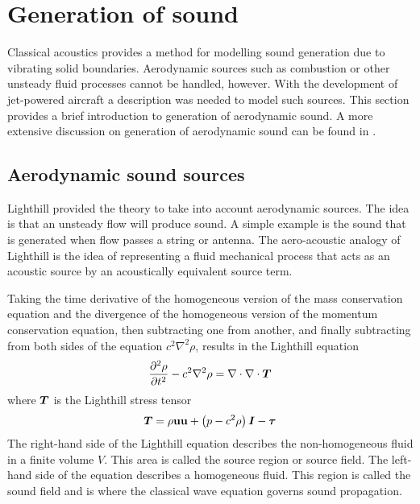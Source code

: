 \section{Generation of sound}\label{sec:theory:generation}

Classical acoustics provides a method for modelling sound generation due to
vibrating solid boundaries. Aerodynamic sources such as combustion or other
unsteady fluid processes cannot be handled, however. With the development of
jet-powered aircraft a description was needed to model such sources. This
section provides a brief introduction to generation of aerodynamic sound. A more
extensive discussion on generation of aerodynamic sound can be found in
\cite{Rienstra2017}.

\subsection{Aerodynamic sound sources}\label{sec:theory:sound:aerodynamic}
Lighthill provided the theory to take into account aerodynamic sources. The idea
is that an unsteady flow will produce sound. A simple example is the sound that
is generated when flow passes a string or antenna. The aero-acoustic analogy of
Lighthill is the idea of representing a fluid mechanical process that acts as an
acoustic source by an acoustically equivalent source term.


Taking the time derivative of the homogeneous version of the mass conservation
equation and the divergence of the homogeneous version of the momentum
conservation equation, then subtracting one from another, and finally
subtracting from both sides of the equation $c^2 \nabla^2 \rho$, results in the
Lighthill equation
\begin{equation}\label{eq:theory:sound:generation:lighthill}
  \frac{\partial^2 \rho}{\partial t^2} - c^2 \nabla^2 \rho = \nabla \cdot \nabla \cdot \bm{T}
\end{equation}
where $\bm{T}$ is the Lighthill stress tensor
\begin{equation}\label{eq:theory:sound:generation:lighthill-tensor}
  \bm{T} = \rho \mathbf{u}\mathbf{u} + \left( p - c^2 \rho \right) \bm{I} - \bm{\tau}
\end{equation}
The right-hand side of the Lighthill equation describes the non-homogeneous
fluid in a finite volume $V$. This area is called the source region or source
field. The left-hand side of the equation describes a homogeneous fluid. This
region is called the sound field and is where the classical wave equation
governs sound propagation.

